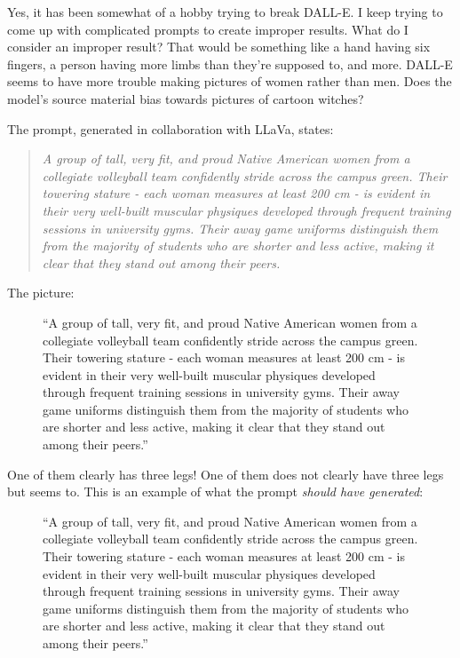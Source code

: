 Yes, it has been somewhat of a hobby trying to break DALL-E. I keep
trying to come up with complicated prompts to create improper results.
What do I consider an improper result? That would be something like a
hand having six fingers, a person having more limbs than they're
supposed to, and more. DALL-E seems to have more trouble making pictures
of women rather than men. Does the model's source material bias towards
pictures of cartoon witches?

The prompt, generated in collaboration with LLaVa, states:

\begin{quote}
\emph{A group of tall, very fit, and proud Native American women from a
collegiate volleyball team confidently stride across the campus green.
Their towering stature - each woman measures at least 200 cm - is
evident in their very well-built muscular physiques developed through
frequent training sessions in university gyms. Their away game uniforms
distinguish them from the majority of students who are shorter and less
active, making it clear that they stand out among their peers.}
\end{quote}

The picture:

\begin{figure}
\centering
{}
\caption{``A group of tall, very fit, and proud Native American women
from a collegiate volleyball team confidently stride across the campus
green. Their towering stature - each woman measures at least 200 cm - is
evident in their very well-built muscular physiques developed through
frequent training sessions in university gyms. Their away game uniforms
distinguish them from the majority of students who are shorter and less
active, making it clear that they stand out among their peers.''}
\end{figure}

One of them clearly has three legs! One of them does not clearly have
three legs but seems to. This is an example of what the prompt
\emph{should have generated}:

\begin{figure}
\centering
{}
\caption{``A group of tall, very fit, and proud Native American women
from a collegiate volleyball team confidently stride across the campus
green. Their towering stature - each woman measures at least 200 cm - is
evident in their very well-built muscular physiques developed through
frequent training sessions in university gyms. Their away game uniforms
distinguish them from the majority of students who are shorter and less
active, making it clear that they stand out among their peers.''}
\end{figure}


